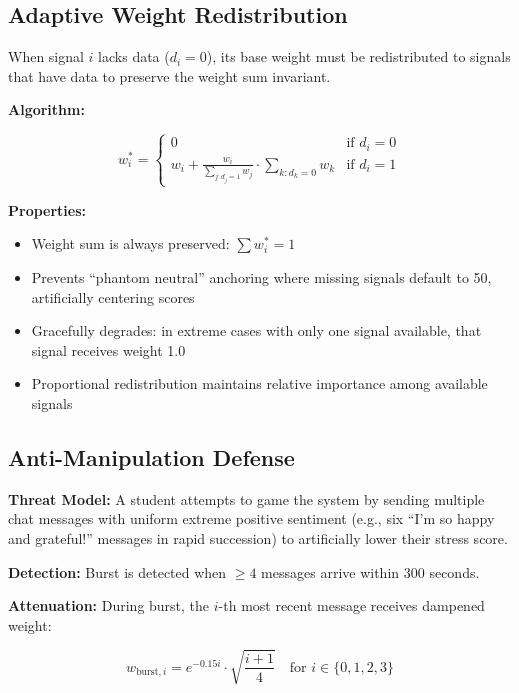 \documentclass[journal]{IEEEtran}
\begin{document}
\subsection{Adaptive Weight Redistribution}

When signal $i$ lacks data ($d_i = 0$), its base weight must be redistributed to signals that have data to preserve the weight sum invariant.

\textbf{Algorithm:}

\begin{equation}
w_i^{*} = \begin{cases}
0 & \text{if } d_i = 0 \\
w_i + \frac{w_i}{\sum_{j:d_j=1} w_j} \cdot \sum_{k:d_k=0} w_k & \text{if } d_i = 1
\end{cases}
\end{equation}

\textbf{Properties:}
\begin{itemize}
    \item Weight sum is always preserved: $\sum w_i^{*} = 1$
    \item Prevents ``phantom neutral'' anchoring where missing signals default to 50, artificially centering scores
    \item Gracefully degrades: in extreme cases with only one signal available, that signal receives weight 1.0
    \item Proportional redistribution maintains relative importance among available signals
\end{itemize}

\subsection{Anti-Manipulation Defense}

\textbf{Threat Model:} A student attempts to game the system by sending multiple chat messages with uniform extreme positive sentiment (e.g., six ``I'm so happy and grateful!'' messages in rapid succession) to artificially lower their stress score.

\textbf{Detection:} Burst is detected when $\geq 4$ messages arrive within 300 seconds.

\textbf{Attenuation:} During burst, the $i$-th most recent message receives dampened weight:

\begin{equation}
w_{\text{burst},i} = e^{-0.15i} \cdot \sqrt{\frac{i + 1}{4}} \quad \text{for } i \in \{0,1,2,3\}
\end{equation}
\end{document}
